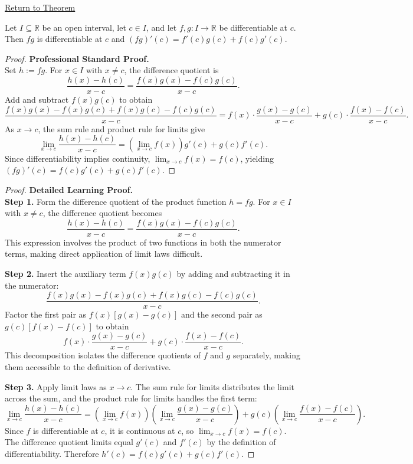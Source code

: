 \newpage
{}
\label{prf:product-rule}

\begin{remark*}[Return]
\hyperref[thm:product-rule]{Return to Theorem}
\end{remark*}

\begin{theorem*}
Let $I \subseteq \mathbb{R}$ be an open interval, let $c \in I$, and let $f, g : I \to \mathbb{R}$ be differentiable at $c$. Then $fg$ is differentiable at $c$ and $(fg)'(c) = f'(c)g(c) + f(c)g'(c)$.
\end{theorem*}

\begin{proof}
\textbf{Professional Standard Proof.}~\\
Set $h := fg$. For $x \in I$ with $x \neq c$, the difference quotient is
\[
  \frac{h(x) - h(c)}{x - c} = \frac{f(x)g(x) - f(c)g(c)}{x - c}.
\]
Add and subtract $f(x)g(c)$ to obtain
\[
  \frac{f(x)g(x) - f(x)g(c) + f(x)g(c) - f(c)g(c)}{x - c}
  = f(x) \cdot \frac{g(x) - g(c)}{x - c} + g(c) \cdot \frac{f(x) - f(c)}{x - c}.
\]
As $x \to c$, the sum rule and product rule for limits give
\[
  \lim_{x \to c} \frac{h(x) - h(c)}{x - c}
  = \left(\lim_{x \to c} f(x)\right) g'(c) + g(c) f'(c).
\]
Since differentiability implies continuity, $\lim_{x \to c} f(x) = f(c)$, yielding $(fg)'(c) = f(c)g'(c) + g(c)f'(c)$.
\end{proof}

\begin{proof}
\textbf{Detailed Learning Proof.}~\\

\textbf{Step 1.} Form the difference quotient of the product function $h = fg$. For $x \in I$ with $x \neq c$, the difference quotient becomes
\[
  \frac{h(x) - h(c)}{x - c} = \frac{f(x)g(x) - f(c)g(c)}{x - c}.
\]
This expression involves the product of two functions in both the numerator terms, making direct application of limit laws difficult.

\textbf{Step 2.} Insert the auxiliary term $f(x)g(c)$ by adding and subtracting it in the numerator:
\[
  \frac{f(x)g(x) - f(x)g(c) + f(x)g(c) - f(c)g(c)}{x - c}.
\]
Factor the first pair as $f(x)[g(x) - g(c)]$ and the second pair as $g(c)[f(x) - f(c)]$ to obtain
\[
  f(x) \cdot \frac{g(x) - g(c)}{x - c} + g(c) \cdot \frac{f(x) - f(c)}{x - c}.
\]
This decomposition isolates the difference quotients of $f$ and $g$ separately, making them accessible to the definition of derivative.

\textbf{Step 3.} Apply limit laws as $x \to c$. The sum rule for limits distributes the limit across the sum, and the product rule for limits handles the first term:
\[
  \lim_{x \to c} \frac{h(x) - h(c)}{x - c} = \left(\lim_{x \to c} f(x)\right)\left(\lim_{x \to c} \frac{g(x) - g(c)}{x - c}\right) + g(c)\left(\lim_{x \to c} \frac{f(x) - f(c)}{x - c}\right).
\]
Since $f$ is differentiable at $c$, it is continuous at $c$, so $\lim_{x \to c} f(x) = f(c)$. The difference quotient limits equal $g'(c)$ and $f'(c)$ by the definition of differentiability. Therefore $h'(c) = f(c)g'(c) + g(c)f'(c)$.
\end{proof}

